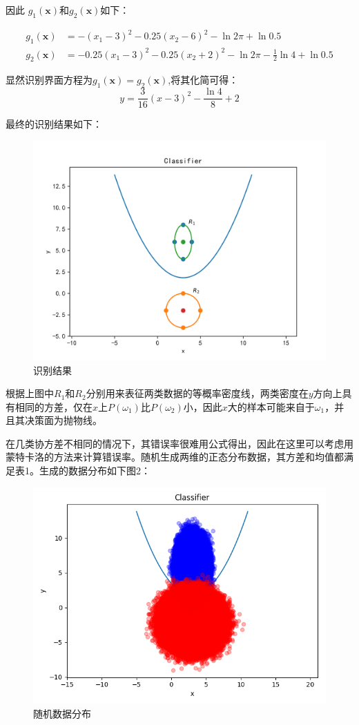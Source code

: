 \documentclass{article}
\newcommand{\hs}{\hspace{2em}}
\begin{document}
\hs 因此 $g_1({\bm x})$和$g_2({\bm x})$如下：

\begin{equation*}
\begin{split}
g_1({\bm x})&= -(x_1-3)^2-0.25(x_2-6)^2-\ln2\pi+ \ln 0.5 \\
g_2({\bm x})&= -0.25(x_1-3)^2-0.25(x_2+2)^2-\ln2\pi- \frac{1}{2}\ln 4+ \ln 0.5
\end{split}
\end{equation*}

{}

\hs 显然识别界面方程为$g_1({\bm x})=g_2({\bm x})$,将其化简可得：
\begin{equation*}
 y = \frac{3}{16}(x-3)^2-\frac{\ln 4 }{8} + 2
\end{equation*}


{}

最终的识别结果如下：
\begin{figure}[htbp]
	\centering
	\includegraphics[width=0.6\linewidth]{img//fig1}
	\caption{识别结果}
\end{figure}

\hs 根据上图中$R_1$和$R_2$分别用来表征两类数据的等概率密度线，两类密度在$y$方向上具有相同的方差，仅在$x$上$P(\omega_1)$比$P(\omega_2)$小，因此$x$大的样本可能来自于$\omega_1$，并且其决策面为抛物线。\\

{}

\hs 在几类协方差不相同的情况下，其错误率很难用公式得出，因此在这里可以考虑用蒙特卡洛的方法来计算错误率。随机生成两维的正态分布数据，其方差和均值都满足表1。生成的数据分布如下图2：

\begin{figure}[H]
	\centering
	\includegraphics[width=0.6\linewidth]{img//fig2}
	\caption{随机数据分布}
\end{figure}
\end{document}
